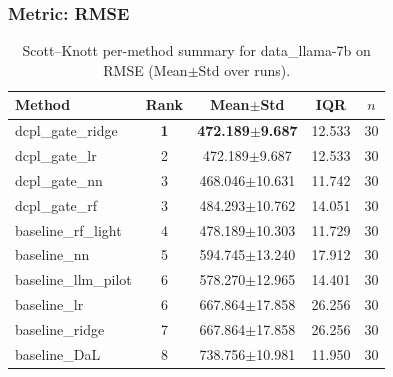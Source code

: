 \subsubsection*{Metric: RMSE}
\begin{table}[H]
\centering
\scriptsize
\setlength{\tabcolsep}{4pt}
\renewcommand{\arraystretch}{1.1}
\caption{Scott--Knott per-method summary for data\_llama-7b on RMSE (Mean$\pm$Std over runs).}
\label{tab:sk_data_llama-7b_RMSE}
\begin{tabular}{l|c|c|c|c}
\hline
\textbf{Method} & \textbf{Rank} & \textbf{Mean$\pm$Std} & \textbf{IQR} & \textbf{$n$} \\
\hline
\rowcolor{red!15} dcpl\_gate\_ridge & \textbf{1} & \textbf{472.189$\pm$9.687} & 12.533 & 30 \\
dcpl\_gate\_lr & 2 & 472.189$\pm$9.687 & 12.533 & 30 \\
dcpl\_gate\_nn & 3 & 468.046$\pm$10.631 & 11.742 & 30 \\
dcpl\_gate\_rf & 3 & 484.293$\pm$10.762 & 14.051 & 30 \\
baseline\_rf\_light & 4 & 478.189$\pm$10.303 & 11.729 & 30 \\
baseline\_nn & 5 & 594.745$\pm$13.240 & 17.912 & 30 \\
baseline\_llm\_pilot & 6 & 578.270$\pm$12.965 & 14.401 & 30 \\
baseline\_lr & 6 & 667.864$\pm$17.858 & 26.256 & 30 \\
baseline\_ridge & 7 & 667.864$\pm$17.858 & 26.256 & 30 \\
baseline\_DaL & 8 & 738.756$\pm$10.981 & 11.950 & 30 \\
\hline
\end{tabular}
\end{table}

